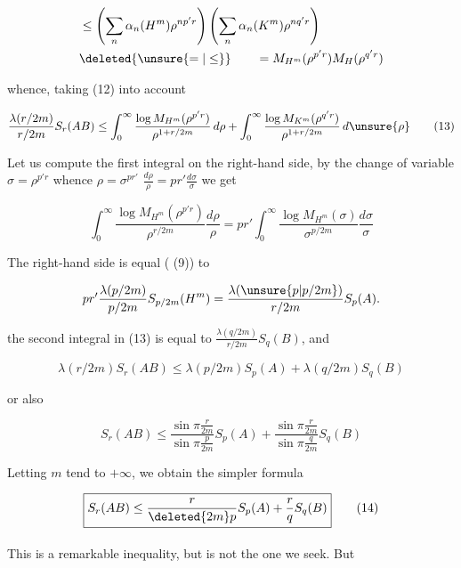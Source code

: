 \[
\begin{aligned}
&\leq\left(\sum_n\alpha_n(H^m)\rho^{np'r}\right)
\left(\sum_n\alpha_n(K^m)\rho^{nq'r}\right)\\
&\deleted{\unsure{=|\leq}}\qquad=M_{H^m}(\rho^{p'r})M_H(\rho^{q'r})
\end{aligned}
\]

whence, taking (12) into account

\[
\frac{\lambda(r/2m)}{r/2m}S_r(AB)\leq
\int_0^\infty\frac{\log M_{H^m}(\rho^{p'r})}{\rho^{1+r/2m}}\,d\rho+
\int_0^\infty\frac{\log M_{K^m}(\rho^{q'r})}{\rho^{1+r/2m}}\,d\unsure{\rho}
\tag*{(13)}
\]

Let us compute  the first integral on the right-hand side, by the change of variable $\sigma=\rho^{p'r}$ whence $\rho=\sigma^{pr'}$ $\frac{d\rho}{\rho}=pr'\frac{d\sigma}{\sigma}$ we get

\[
\int_0^\infty\frac{\log M_{H^m}(\rho^{p'r})}{\rho^{r/2m}}\frac{d\rho}{\rho}
=pr'\int_0^\infty\frac{\log M_{H^m}(\sigma)}{\sigma^{p/2m}}\frac{d\sigma}{\sigma}
\]

The right-hand side is equal ( (9)) to

\[
pr'\frac{\lambda(p/2m)}{p/2m}S_{p/2m}(H^m)=\frac{\lambda(\unsure{p|p/2m})}{r/2m}S_p(A).
\]

 the second integral in (13) is equal to $\frac{\lambda(q/2m)}{r/2m}S_q(B)$, and  

\[
\lambda(r/2m)S_r(AB)\leq\lambda(p/2m)S_p(A)+\lambda(q/2m)S_q(B)
\]

or also

\[
S_r(AB)\leq\frac{\sin\pi\frac{r}{2m}}{\sin\pi\frac{p}{2m}}S_p(A)+
\frac{\sin\pi\frac{r}{2m}}{\sin\pi\frac{q}{2m}}S_q(B)
\]


Letting $m$ tend to $+\infty$, we obtain the simpler formula

\[
\boxed{S_r(AB)\leq\frac{r}{\deleted{2m}p}S_p(A)+\frac rq S_q(B)}\tag*{(14)}
\]

This is a remarkable inequality, but is not the one we seek. But \textsuperscript{}

